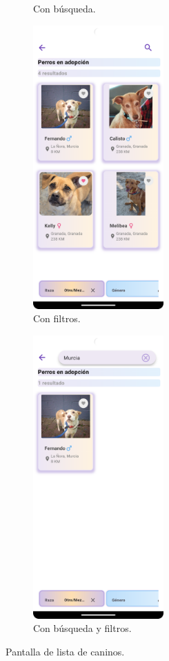 \documentclass[a4paper, 12pt]{article}
\begin{document}
\begin{figure}[H]
\begin{subfigure}{0.48\textwidth}
\begin{center}
			\caption{Con búsqueda.}
		\end{center}  
	\end{subfigure}\hfill
   	\begin{subfigure}{0.48\textwidth}
		\begin{center}
			{\includegraphics[width=5cm]{app/DogListFilter.png}\par}
			\caption{Con filtros.}
		\end{center}  
	\end{subfigure}\hfill
   	\begin{subfigure}{0.48\textwidth}
		\begin{center}
			{\includegraphics[width=5cm]{app/DogListSearchFilter.png}\par}
			\caption{Con búsqueda y filtros.}
		\end{center}  
	\end{subfigure}\hfill
	\caption{Pantalla de lista de caninos.}
\end{figure}
\end{document}
